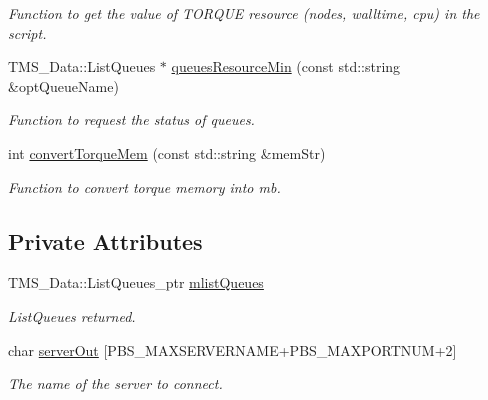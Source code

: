 \begin{DoxyCompactItemize}
\begin{DoxyCompactList}\small\item\em Function to get the value of TORQUE resource (nodes, walltime, cpu) in the script. \item\end{DoxyCompactList}\item 
TMS\_\-Data::ListQueues $\ast$ \hyperlink{classTorqueServer_a5a78dc0220cca1f1929782503136aa0e}{queuesResourceMin} (const std::string \&optQueueName)
\begin{DoxyCompactList}\small\item\em Function to request the status of queues. \item\end{DoxyCompactList}\item 
int \hyperlink{classTorqueServer_ac5675d4a8fa217925824a146ac93750f}{convertTorqueMem} (const std::string \&memStr)
\begin{DoxyCompactList}\small\item\em Function to convert torque memory into mb. \item\end{DoxyCompactList}\end{DoxyCompactItemize}
\subsection*{Private Attributes}
\begin{DoxyCompactItemize}
\item 
\hypertarget{classTorqueServer_ada6a31f5672ecf7297dfac26ed62e19a}{
TMS\_\-Data::ListQueues\_\-ptr \hyperlink{classTorqueServer_ada6a31f5672ecf7297dfac26ed62e19a}{mlistQueues}}
\label{classTorqueServer_ada6a31f5672ecf7297dfac26ed62e19a}

\begin{DoxyCompactList}\small\item\em ListQueues returned. \item\end{DoxyCompactList}\item 
\hypertarget{classTorqueServer_ae798d6ea4f01fc4336756a0cba5a644c}{
char \hyperlink{classTorqueServer_ae798d6ea4f01fc4336756a0cba5a644c}{serverOut} \mbox{[}PBS\_\-MAXSERVERNAME+PBS\_\-MAXPORTNUM+2\mbox{]}}
\label{classTorqueServer_ae798d6ea4f01fc4336756a0cba5a644c}

\begin{DoxyCompactList}\small\item\em The name of the server to connect. \item\end{DoxyCompactList}\end{DoxyCompactItemize}


